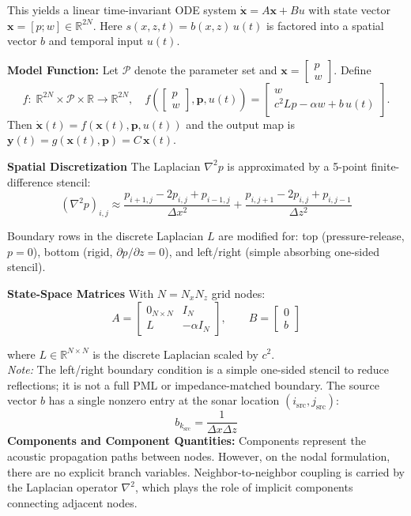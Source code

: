 \documentclass[11pt]{article}
\begin{document}
This yields a linear time-invariant ODE system $
\dot{\mathbf{x}} = A\mathbf{x} + B u$ with state vector $\mathbf{x} = [p; w] \in \mathbb{R}^{2N}$. Here $s(x,z,t) = b(x,z)\,u(t)$ is factored into a spatial vector $b$ and temporal input $u(t)$.

\textbf{Model Function:} Let $\mathcal{P}$ denote the parameter set and $\mathbf{x} = \begin{bmatrix}p\\ w\end{bmatrix}$. Define
\[
f:\; \mathbb{R}^{2N} \times \mathcal{P} \times \mathbb{R} \to \mathbb{R}^{2N},\quad
f\!\left(\begin{bmatrix}p\\ w\end{bmatrix},\mathbf{p},u(t)\right)
=
\begin{bmatrix}
w\\[2pt]
c^{2} L p - \alpha w + b\,u(t)
\end{bmatrix}.
\]
Then $\dot{\mathbf{x}}(t) = f(\mathbf{x}(t),\mathbf{p},u(t))$ and the output map is $\mathbf{y}(t)=g(\mathbf{x}(t),\mathbf{p})=C\,\mathbf{x}(t)$.

\textbf{Spatial Discretization} The Laplacian $\nabla^2 p$ is approximated by a 5-point finite-difference stencil:
\[
(\nabla^2 p)_{i,j} \approx
\frac{p_{i+1,j}-2p_{i,j}+p_{i-1,j}}{\Delta x^2} +
\frac{p_{i,j+1}-2p_{i,j}+p_{i,j-1}}{\Delta z^2}
\]

Boundary rows in the discrete Laplacian $L$ are modified for: top (pressure-release, $p=0$), bottom (rigid, $\partial p/\partial z=0$), and left/right (simple absorbing one-sided stencil).

\textbf{State-Space Matrices} With $N=N_x N_z$ grid nodes:
\[
A = 
\begin{bmatrix}
0_{N\times N} & I_{N} \\
L & -\alpha I_{N}
\end{bmatrix},
\qquad
B = \begin{bmatrix} 0 \\ b \end{bmatrix}
\]

where $L \in \mathbb{R}^{N\times N}$ is the discrete Laplacian scaled by $c^2$.  \\
\textit{Note:} The left/right boundary condition is a simple one-sided stencil to reduce reflections; it is not a full PML or impedance-matched boundary.
The source vector $b$ has a single nonzero entry at the sonar location $(i_\mathrm{src},j_\mathrm{src})$:
\[
b_{k_\mathrm{src}} = \frac{1}{\Delta x \Delta z}
\]
\textbf{Components and Component Quantities:} Components represent the acoustic propagation paths between nodes. However, on the nodal formulation, there are no explicit branch variables. Neighbor-to-neighbor coupling is carried by the Laplacian operator $\nabla^2$, which plays the role of implicit components connecting adjacent nodes.
\end{document}
